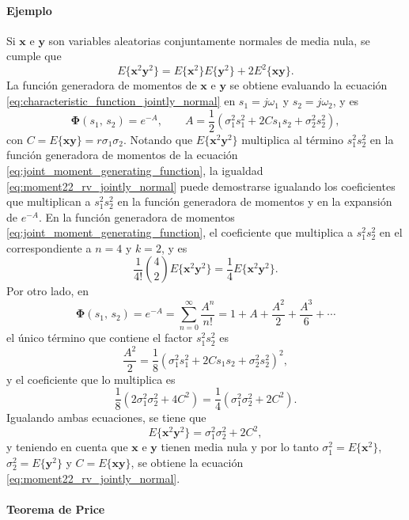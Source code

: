 \documentclass[a4paper]{report}
\newcommand{\x}{\mathbf{x}}
\newcommand{\y}{\mathbf{y}}
\newcommand{\Phibf}{\mathbf{\Phi}}
\begin{document}
\paragraph{Ejemplo} Si \(\x\) e \(\y\) son variables aleatorias conjuntamente normales de media nula, se cumple que
\begin{equation}\label{eq:moment22_rv_jointly_normal}
  E\{\x^2\y^2\}=E\{\x^2\}E\{\y^2\}+2E^2\{\x\y\}.
\end{equation}
La función generadora de momentos de \(\x\) e \(\y\) se obtiene evaluando la ecuación \ref{eq:characteristic_function_jointly_normal} en \(s_1=j\omega_1\) y \(s_2=j\omega_2\), y es
\[
 \Phibf(s_1,\,s_2)=e^{-A},\qquad A=\frac{1}{2}\left(\sigma_1^2s_1^2+2Cs_1s_2+\sigma_2^2s_2^2\right),
\]
con \(C=E\{\x\y\}=r\sigma_1\sigma_2\). Notando que \(E\{\x^2\y^2\}\) multiplica al término \(s_1^2s_2^2\) en la función generadora de momentos de la ecuación \ref{eq:joint_moment_generating_function}, la igualdad \ref{eq:moment22_rv_jointly_normal} puede demostrarse igualando los coeficientes que multiplican a \(s_1^2s_2^2\) en la función generadora de momentos y en la expansión de \(e^{-A}\). En la función generadora de momentos \ref{eq:joint_moment_generating_function}, el coeficiente que multiplica a \(s_1^2s_2^2\) en el correspondiente a \(n=4\) y \(k=2\), y es
\[
 \frac{1}{4!}\binom{4}{2}E\{\x^2\y^2\}=\frac{1}{4}E\{\x^2\y^2\}.
\]
Por otro lado, en
\[
 \Phibf(s_1,\,s_2)=e^{-A}=\sum_{n=0}^{\infty}\frac{A^n}{n!}=1+A+\frac{A^2}{2}+\frac{A^3}{6}+\cdots
\]
el único término que contiene el factor \(s_1^2s_2^2\) es
\[
 \frac{A^2}{2}=\frac{1}{8}\left(\sigma_1^2s_1^2+2Cs_1s_2+\sigma_2^2s_2^2\right)^2,
\]
y el coeficiente que lo multiplica es
\[
 \frac{1}{8}\left(2\sigma_1^2\sigma_2^2+4C^2\right)=\frac{1}{4}\left(\sigma_1^2\sigma_2^2+2C^2\right).
\]
Igualando ambas ecuaciones, se tiene que
\[
 E\{\x^2\y^2\}=\sigma_1^2\sigma_2^2+2C^2,
\]
y teniendo en cuenta que \(\x\) e \(\y\) tienen media nula y por lo tanto \(\sigma_1^2=E\{\x^2\}\), \(\sigma_2^2=E\{\y^2\}\) y \(C=E\{\x\y\}\), se obtiene la ecuación \ref{eq:moment22_rv_jointly_normal}.

\paragraph{Teorema de Price}
\end{document}
